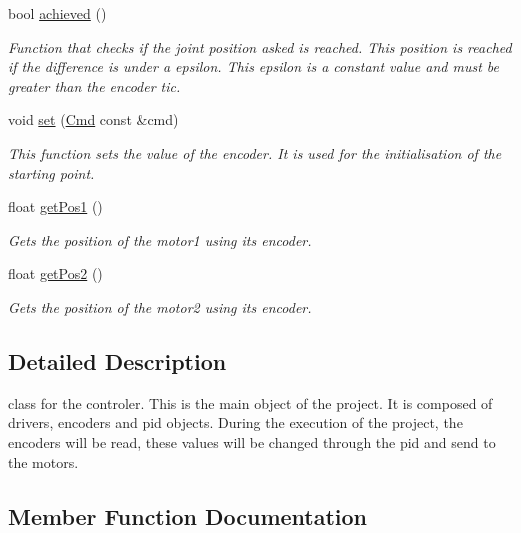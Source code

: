 \begin{DoxyCompactItemize}
bool \mbox{\hyperlink{class_controller_a83e3d022550cade03428a2b3d652d44e}{achieved}} ()
\begin{DoxyCompactList}\small\item\em Function that checks if the joint position asked is reached. This position is reached if the difference is under a epsilon. This epsilon is a constant value and must be greater than the encoder tic. \end{DoxyCompactList}\item 
void \mbox{\hyperlink{class_controller_ada97ae2907e98c1da834c1eb97b5ab30}{set}} (\mbox{\hyperlink{struct_cmd}{Cmd}} const \&cmd)
\begin{DoxyCompactList}\small\item\em This function sets the value of the encoder. It is used for the initialisation of the starting point. \end{DoxyCompactList}\item 
float \mbox{\hyperlink{class_controller_a4c61c7da0184034877c220fd4e956dc6}{get\+Pos1}} ()
\begin{DoxyCompactList}\small\item\em Gets the position of the motor1 using its encoder. \end{DoxyCompactList}\item 
float \mbox{\hyperlink{class_controller_a83ab5840be5fa59e1a56397eda27f062}{get\+Pos2}} ()
\begin{DoxyCompactList}\small\item\em Gets the position of the motor2 using its encoder. \end{DoxyCompactList}\end{DoxyCompactItemize}


\subsection{Detailed Description}
class for the controler. This is the main object of the project. It is composed of drivers, encoders and pid objects. During the execution of the project, the encoders will be read, these values will be changed through the pid and send to the motors. 



\subsection{Member Function Documentation}
\mbox{\label{class_controller_a83e3d022550cade03428a2b3d652d44e}} 
